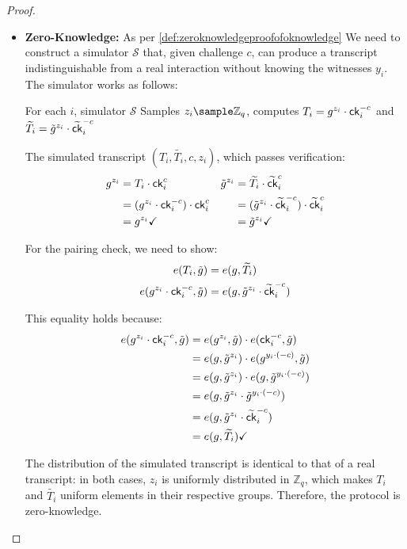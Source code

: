 \begin{proof}
\begin{itemize}
    \item \textbf{Zero-Knowledge:} As per \ref{def:zeroknowledgeproofofoknowledge} We need to construct a simulator $\mathcal{S}$ that, given challenge $c$, can produce a transcript indistinguishable from a real interaction without knowing the witnesses $y_i$. The simulator works as follows:

    For each $i$, simulator $\mathcal{S}$ Samples $z_i \sample \mathbb{Z}_q$, computes $T_i = g^{z_i} \cdot \mathsf{ck}_i^{-c}$ and $\widetilde{T_i} = \tilde{g}^{z_i} \cdot \widetilde{\mathsf{ck}}_i^{-c}$
    
    The simulated transcript $(T_i, \widetilde{T_i}, c, z_i)$, which passes verification:
    \begin{align*}
    g^{z_i} &= T_i \cdot \mathsf{ck}_i^c                &     \tilde{g}^{z_i} &= \widetilde{T_i} \cdot \widetilde{\mathsf{ck}}_i^c      \\
    &= (g^{z_i} \cdot \mathsf{ck}_i^{-c}) \cdot \mathsf{ck}_i^c &      &= (\tilde{g}^{z_i} \cdot \widetilde{\mathsf{ck}}_i^{-c}) \cdot \widetilde{\mathsf{ck}}_i^c     \\
    &= g^{z_i} \checkmark                       & &= \tilde{g}^{z_i} \checkmark
    \end{align*}
    
    For the pairing check, we need to show:
    \begin{align*}
    e(T_i, \tilde{g}) &= e(g, \widetilde{T_i}) \\
    e(g^{z_i} \cdot \mathsf{ck}_i^{-c}, \tilde{g}) &= e(g, \tilde{g}^{z_i} \cdot \widetilde{\mathsf{ck}}_i^{-c})
    \end{align*}
    
    This equality holds because:
    \begin{align*}
    e(g^{z_i} \cdot \mathsf{ck}_i^{-c}, \tilde{g}) &= e(g^{z_i}, \tilde{g}) \cdot e(\mathsf{ck}_i^{-c}, \tilde{g}) \\
    &= e(g, \tilde{g}^{z_i}) \cdot e(g^{y_i \cdot (-c)}, \tilde{g}) \\
    &= e(g, \tilde{g}^{z_i}) \cdot e(g, \tilde{g}^{y_i \cdot (-c)}) \\
    &= e(g, \tilde{g}^{z_i} \cdot \tilde{g}^{y_i \cdot (-c)}) \\
    &= e(g, \tilde{g}^{z_i} \cdot \widetilde{\mathsf{ck}}_i^{-c}) \\
    &= e(g, \widetilde{T_i}) \checkmark
    \end{align*}
    
    The distribution of the simulated transcript is identical to that of a real transcript: in both cases, $z_i$ is uniformly distributed in $\mathbb{Z}_q$, which makes $T_i$ and $\widetilde{T_i}$ uniform elements in their respective groups. Therefore, the protocol is zero-knowledge.
    \end{itemize}
    \end{proof}


















